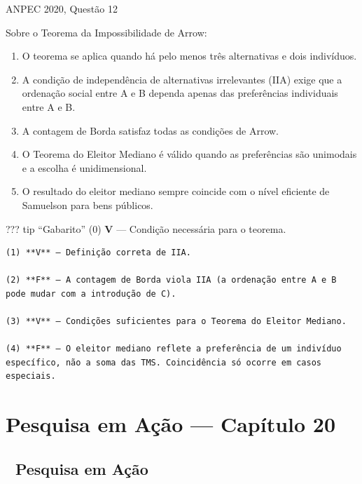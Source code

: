 \documentclass[11pt,twoside,openright]{book}
\begin{document}
\begin{infobox}{ANPEC 2020, Questão 12}

Sobre o Teorema da Impossibilidade de Arrow:

\begin{enumerate}
\def\labelenumi{(\arabic{enumi})}
\setcounter{enumi}{-1}
\item
  O teorema se aplica quando há pelo menos três alternativas e dois
  indivíduos.
\item
  A condição de independência de alternativas irrelevantes (IIA) exige
  que a ordenação social entre A e B dependa apenas das preferências
  individuais entre A e B.
\item
  A contagem de Borda satisfaz todas as condições de Arrow.
\item
  O Teorema do Eleitor Mediano é válido quando as preferências são
  unimodais e a escolha é unidimensional.
\item
  O resultado do eleitor mediano sempre coincide com o nível eficiente
  de Samuelson para bens públicos.
\end{enumerate}

??? tip ``Gabarito'' (0) \textbf{V} --- Condição necessária para o
teorema.

\begin{verbatim}
(1) **V** — Definição correta de IIA.

(2) **F** — A contagem de Borda viola IIA (a ordenação entre A e B pode mudar com a introdução de C).

(3) **V** — Condições suficientes para o Teorema do Eleitor Mediano.

(4) **F** — O eleitor mediano reflete a preferência de um indivíduo específico, não a soma das TMS. Coincidência só ocorre em casos especiais.
\end{verbatim}

\end{infobox}

\chapter{Pesquisa em Ação --- Capítulo
20}\label{pesquisa-em-auxe7uxe3o-capuxedtulo-20}

\section{🔬 Pesquisa em Ação}\label{pesquisa-em-auxe7uxe3o-2}
\end{document}
